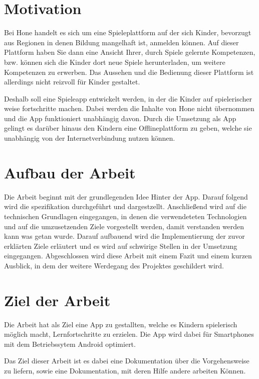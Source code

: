 \section{Motivation}
Bei Hone handelt es sich um eine Spieleplattform auf der sich Kinder, bevorzugt aus Regionen in denen Bildung mangelhaft ist, anmelden können. Auf dieser Plattform haben Sie dann eine Ansicht Ihrer, durch Spiele gelernte Kompetenzen, bzw. können sich die Kinder dort neue Spiele herunterladen, um weitere Kompetenzen zu erwerben. Das Aussehen und die Bedienung dieser Plattform ist allerdings nicht reizvoll für Kinder gestaltet. 

Deshalb soll eine Spieleapp entwickelt werden, in der die Kinder auf spielerischer weise fortschritte machen. Dabei werden die Inhalte von Hone nicht übernommen und die App funktioniert unabhängig davon. Durch die Umsetzung als App gelingt es darüber hinaus den Kindern eine Offlineplattform zu geben, welche sie unabhängig von der Internetverbindung nutzen können. 

\section{Aufbau der Arbeit}

Die Arbeit beginnt mit der grundlegenden Idee Hinter der App. Darauf folgend wird die spezifikation durchgeführt und dargestzellt. Anschließend wird auf die technischen Grundlagen eingegangen, in denen die verwendeteten Technologien und auf die umzusetzenden Ziele vorgestellt werden, damit verstanden werden kann was getan wurde. Darauf aufbauend wird die Implementierung der zuvor erklärten Ziele erläutert und es wird auf schwirige Stellen in der Umsetzung eingegangen. Abgeschlossen wird diese Arbeit mit einem Fazit und einem kurzen Ausblick, in dem der weitere Werdegang des Projektes geschildert wird.

\section{Ziel der Arbeit}

Die Arbeit hat als Ziel eine App zu gestallten, welche es Kindern spielerisch möglich macht, Lernfortschritte zu erzielen. Die App wird dabei für Smartphones mit dem Betriebssytem Android optimiert.

Das Ziel dieser Arbeit ist es dabei eine Dokumentation über die Vorgehensweise zu liefern, sowie eine Dokumentation, mit deren Hilfe andere arbeiten Können.